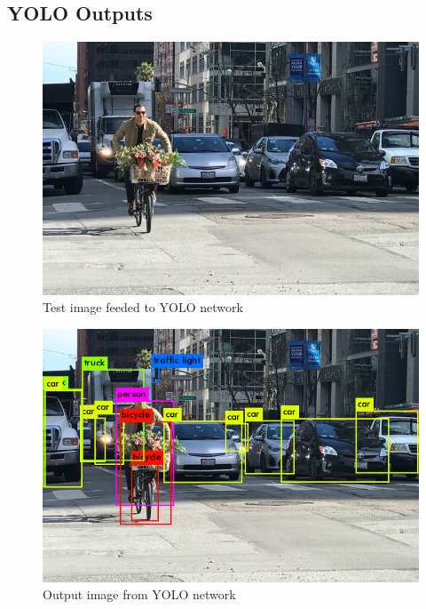             \subsection{YOLO Outputs}
                \begin{figure}[ht]
                    \centering
                    \includegraphics[scale=0.5]{img/testImage.jpeg}
                    \caption{Test image feeded to YOLO network}
                \end{figure}
                \break
                \begin{figure}[ht]
                    \centering
                    \includegraphics[scale=0.5]{img/PredictImage.png}
                    \caption{Output image from YOLO network}
                \end{figure}

